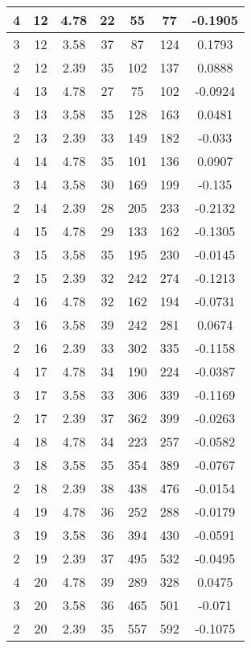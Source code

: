 \documentclass[letterpaper, 12pt]{article}
\begin{document}
\begin{longtable}{|c|c|c|c|c|c|c|}
\hline
4 & 12 & 4.78 & 22 & 55 & 77 & -0.1905 \\
\hline
3 & 12 & 3.58 & 37 & 87 & 124 & 0.1793 \\
\hline
2 & 12 & 2.39 & 35 & 102 & 137 & 0.0888 \\
\hline
4 & 13 & 4.78 & 27 & 75 & 102 & -0.0924 \\
\hline
3 & 13 & 3.58 & 35 & 128 & 163 & 0.0481 \\
\hline
2 & 13 & 2.39 & 33 & 149 & 182 & -0.033 \\
\hline
4 & 14 & 4.78 & 35 & 101 & 136 & 0.0907 \\
\hline
3 & 14 & 3.58 & 30 & 169 & 199 & -0.135 \\
\hline
2 & 14 & 2.39 & 28 & 205 & 233 & -0.2132 \\
\hline
4 & 15 & 4.78 & 29 & 133 & 162 & -0.1305 \\
\hline
3 & 15 & 3.58 & 35 & 195 & 230 & -0.0145 \\
\hline
2 & 15 & 2.39 & 32 & 242 & 274 & -0.1213 \\
\hline
4 & 16 & 4.78 & 32 & 162 & 194 & -0.0731 \\
\hline
3 & 16 & 3.58 & 39 & 242 & 281 & 0.0674 \\
\hline
2 & 16 & 2.39 & 33 & 302 & 335 & -0.1158 \\
\hline
4 & 17 & 4.78 & 34 & 190 & 224 & -0.0387 \\
\hline
3 & 17 & 3.58 & 33 & 306 & 339 & -0.1169 \\
\hline
2 & 17 & 2.39 & 37 & 362 & 399 & -0.0263 \\
\hline
4 & 18 & 4.78 & 34 & 223 & 257 & -0.0582 \\
\hline
3 & 18 & 3.58 & 35 & 354 & 389 & -0.0767 \\
\hline
2 & 18 & 2.39 & 38 & 438 & 476 & -0.0154 \\
\hline
4 & 19 & 4.78 & 36 & 252 & 288 & -0.0179 \\
\hline
3 & 19 & 3.58 & 36 & 394 & 430 & -0.0591 \\
\hline
2 & 19 & 2.39 & 37 & 495 & 532 & -0.0495 \\
\hline
4 & 20 & 4.78 & 39 & 289 & 328 & 0.0475 \\
\hline
3 & 20 & 3.58 & 36 & 465 & 501 & -0.071 \\
\hline
2 & 20 & 2.39 & 35 & 557 & 592 & -0.1075 \\
\hline
\end{longtable}
\end{document}
